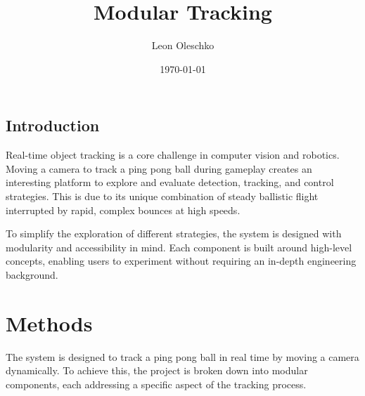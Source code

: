\documentclass[
    parskip=half, 
    twoside=false,
    twocolumn=true,
    fontsize=12pt,
]{scrarticle}
\begin{document}
\title{Modular Tracking}
\author{Leon Oleschko}
\date{\dotdate\today}

\subsection*{Introduction}
Real-time object tracking is a core challenge in computer vision and robotics. Moving a camera to track a ping pong ball during gameplay creates an interesting platform to explore and evaluate detection, tracking, and control strategies. This is due to its unique combination of steady ballistic flight interrupted by rapid, complex bounces at high speeds.

To simplify the exploration of different strategies, the system is designed with modularity and accessibility in mind. Each component is built around high-level concepts, enabling users to experiment without requiring an in-depth engineering background.


\section{Methods}
The system is designed to track a ping pong ball in real time by moving a camera dynamically. To achieve this, the project is broken down into modular components, each addressing a specific aspect of the tracking process. 
\end{document}
